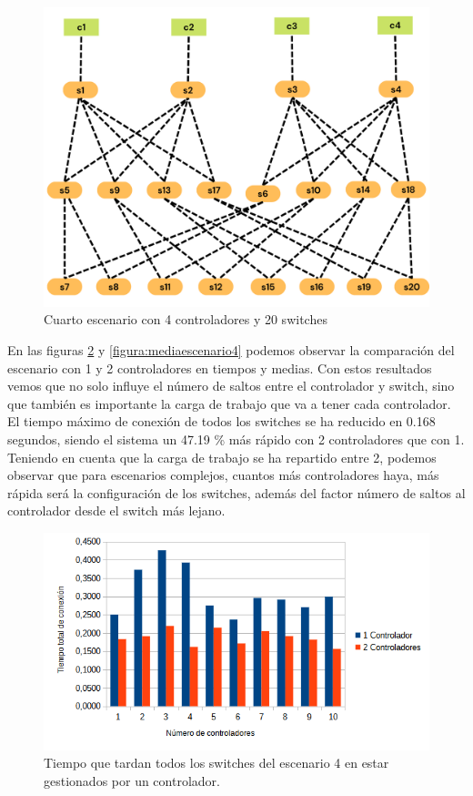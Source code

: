 \documentclass[a4paper, 12pt]{book}
\begin{document}
	
	\begin{figure}[H]
		\centering
		\includegraphics[width=13cm, keepaspectratio]{img/e4_3}
		\caption{Cuarto escenario con 4 controladores y 20 switches}
		\label{figura:e4_3}
	\end{figure}
	
En las figuras \ref{figura:comparativaescenario4} y \ref{figura:mediaescenario4} podemos observar la comparación del escenario con 1 y 2 controladores en tiempos y medias. Con estos resultados vemos que no solo influye el número de saltos entre el controlador y switch, sino que también es importante la carga de trabajo que va a tener cada controlador. El tiempo máximo de conexión de todos los switches se ha reducido en 0.168 segundos, siendo el sistema un 47.19 \% más rápido con 2 controladores que con 1. Teniendo en cuenta que la carga de trabajo se ha repartido entre 2, podemos observar que para escenarios complejos, cuantos más controladores haya, más rápida será la configuración de los switches, además del factor número de saltos al controlador desde el switch más lejano.
		
		
	
	
	\begin{figure}[H]
		\centering
		\includegraphics[width=12cm, keepaspectratio]{img/comparativaescenario4}
		\caption{Tiempo que tardan todos los switches del escenario 4 en estar gestionados por un controlador.}
		\label{figura:comparativaescenario4}
	\end{figure}
	
\end{document}
